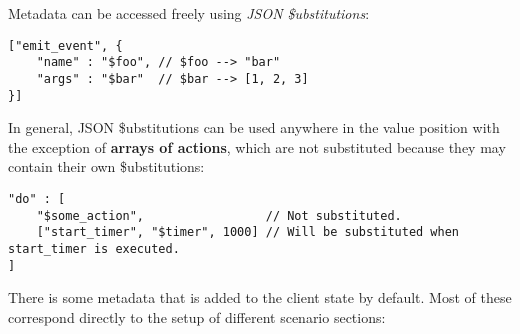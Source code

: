 \documentclass[a4paper]{article}
\begin{document}
\noindent
Metadata can be accessed freely using \emph{JSON \$ubstitutions}:


\begin{verbatim}
["emit_event", {
    "name" : "$foo", // $foo --> "bar"
    "args" : "$bar"  // $bar --> [1, 2, 3]
}]
\end{verbatim}




\noindent
In general, JSON \$ubstitutions can be used anywhere in the value position with the exception of \textbf{arrays of actions}, which are not substituted because they may contain their own \$ubstitutions:


\begin{verbatim}
"do" : [
    "$some_action",                 // Not substituted.
    ["start_timer", "$timer", 1000] // Will be substituted when start_timer is executed.
]
\end{verbatim}




\noindent
There is some metadata that is added to the client state by default. Most of these correspond directly to the setup of different scenario sections:
\end{document}
